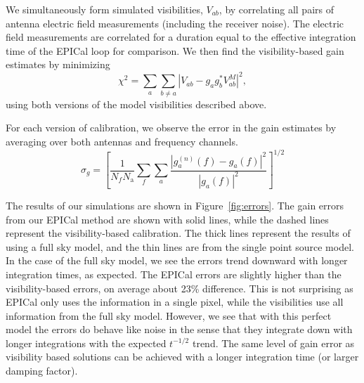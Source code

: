 \documentclass[a4paper,fleqn,usenatbib]{mnras}
\newcommand{\Nant}{\ensuremath{N_{\mathrm{a}}}}
\begin{document}
We simultaneously form simulated visibilities, $V_{ab}$, by correlating all pairs of antenna electric field 
measurements (including the receiver noise). The electric field measurements are correlated for a duration equal to 
the effective integration time of the EPICal loop for comparison. We then find the 
visibility-based gain estimates by minimizing
\begin{equation}\label{eq:vis_cal}
\chi^2 = \sum_a\sum_{b\ne a} \left|V_{ab}-g_a g_b^* V^M_{ab}\right|^2,
\end{equation}
using both versions of the model visibilities described above.

 For each version of calibration, we observe the error in the gain estimates by averaging over both 
 antennas and frequency channels.
\begin{equation}\label{eq:gain_error}
\sigma_g = \left[\frac{1}{N_f \Nant} \sum_f \sum_a \frac{\left|g^{(n)}_a(f)-g_a(f)\right|^2}{\left|g_a(f)\right|^2}\right]^{1/2}
\end{equation}

The results of our simulations are shown in Figure~\ref{fig:errors}. The gain errors from our 
EPICal method are shown with solid lines, while the dashed lines represent the visibility-based 
calibration. The thick lines represent the results of using a full sky model, and the thin lines are 
from the single point source model.  In the case of the full sky model, we see the errors trend 
downward with longer integration times, as expected. The EPICal errors are slightly higher than 
the visibility-based errors, on average about 23\% difference. This is not surprising as EPICal 
only uses the information in a single pixel, while the visibilities use all information from the full 
sky model. However, we see that with this perfect model the errors do behave like noise
in the sense that they integrate down with longer integrations with the expected $t^{-1/2}$ 
trend. 
The same level of gain error as visibility based solutions can be achieved with a longer integration time (or larger damping 
factor).
\end{document}
